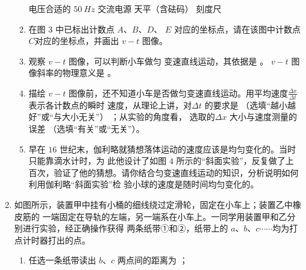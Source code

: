 \begin{enumerate}
\begin{enumerate}
\threechoices
{电压合适的 $ 50 \ Hz $ 交流电源}
{天平（含砝码）}
{刻度尺}

\item 
在图 $ 3 $ 中已标出计数点 $ A $、$ B $、$ D $、
$ E $ 对应的坐标点，请在该图中计数点
$ C $对应的坐标点，并画出 $ v-t $ 图像。


\item 
观察 $ v-t $ 图像，可以判断小车做匀
变速直线运动，其依据是  。	$ v-t $
图像斜率的物理意义是  。

\item 
描绘 $ v-t $ 图像前，还不知道小车是否做匀变速直线运动。用平均速度$\frac{\Delta x}{\Delta t}$
表示各计数点的瞬时
速度，从理论上讲，对$ \Delta t $ 的要求是
（选填“越小越好”或“与大小无关”）
；从实验的角度看，
选取的$ \Delta x $ 大小与速度测量的误差  （选填“有关”或“无关”）。





\item 
早在 $ 16 $ 世纪末，伽利略就猜想落体运动的速度应该是均匀变化的。当时只能靠滴水计时，为
此他设计了如图 $ 4 $ 所示的“斜面实验”，反复做了上
百次，验证了他的猜想。请你结合匀变速直线运动的知识，分析说明如何利用伽利略“斜面实验”检
验小球的速度是随时间均匀变化的。
\begin{figure}[h!]
\centering

\end{figure}


\end{enumerate}




\newpage
\item 
{}
如图所示，装置甲中挂有小桶的细线绕过定滑轮，固定在小车上；装置乙中橡皮筋的
一端固定在导轨的左端，另一端系在小车上。一同学用装置甲和乙分别进行实验，经正确操作获得
两条纸带①和②，纸带上的 $ a $、$ b $、$ c \cdots \cdots $均为打点计时器打出的点。
\begin{figure}[h!]
\centering

\end{figure}




\begin{enumerate}
\renewcommand{\labelenumi}{\arabic{enumi}.}
\item
任选一条纸带读出 $ b $、$ c $ 两点间的距离为
；


\end{enumerate}
\end{enumerate}
